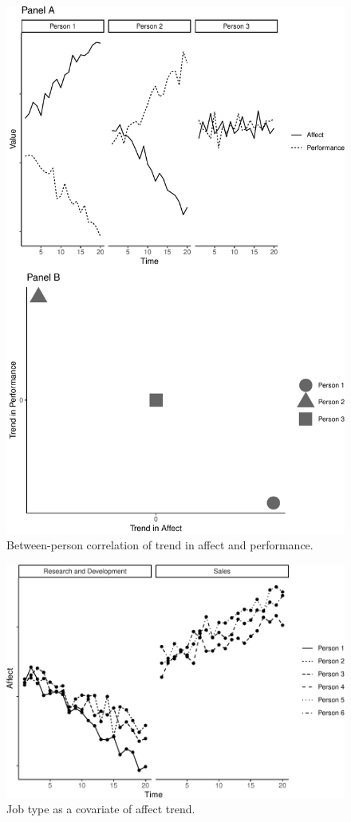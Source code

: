 \documentclass[english,,man]{apa6}
\begin{document}
\begin{figure}
\centering
\includegraphics{figures/unnamed-chunk-11-1.pdf}
\caption{\label{fig:unnamed-chunk-11}Between-person correlation of trend in affect and performance.\label{trend_correlation}}
\end{figure}

\begin{figure}
\centering
\includegraphics{figures/unnamed-chunk-12-1.pdf}
\caption{\label{fig:unnamed-chunk-12}Job type as a covariate of affect trend.\label{trend_covariate}}
\end{figure}
\end{document}
